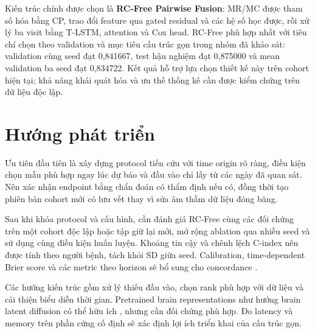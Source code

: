 Kiến trúc chính được chọn là \textbf{RC-Free Pairwise Fusion}: MR/MC được tham số hóa bằng CP, trao đổi feature qua gated residual và các hệ số học được, rồi xử lý ba visit bằng T-LSTM, attention và Cox head. RC-Free phù hợp nhất với tiêu chí chọn theo validation và mục tiêu cấu trúc gọn trong nhóm đã khảo sát: validation cùng seed đạt 0,841667, test hậu nghiệm đạt 0,875000 và mean validation ba seed đạt 0,834722. Kết quả hỗ trợ lựa chọn thiết kế này trên cohort hiện tại; khả năng khái quát hóa và ưu thế thống kê cần được kiểm chứng trên dữ liệu độc lập.

\section{Hướng phát triển}
Ưu tiên đầu tiên là xây dựng protocol tiến cứu với time origin rõ ràng, điều kiện chọn mẫu phù hợp ngay lúc dự báo và đầu vào chỉ lấy từ các ngày đã quan sát. Nên xác nhận endpoint bằng chẩn đoán có thẩm định nếu có, đồng thời tạo phiên bản cohort mới có lưu vết thay vì sửa âm thầm dữ liệu đóng băng.

Sau khi khóa protocol và cấu hình, cần đánh giá RC-Free cùng các đối chứng trên một cohort độc lập hoặc tập giữ lại mới, mở rộng ablation qua nhiều seed và sử dụng cùng điều kiện huấn luyện. Khoảng tin cậy và chênh lệch C-index nên được tính theo người bệnh, tách khỏi SD giữa seed. Calibration, time-dependent Brier score và các metric theo horizon sẽ bổ sung cho concordance \cite{graf1999brier}.

Các hướng kiến trúc gồm xử lý thiếu đầu vào, chọn rank phù hợp với dữ liệu và cải thiện biểu diễn thời gian. Pretrained brain representations như hướng brain latent diffusion có thể hữu ích \cite{li2026longitudinal}, nhưng cần đối chứng phù hợp. Đo latency và memory trên phần cứng cố định sẽ xác định lợi ích triển khai của cấu trúc gọn.
